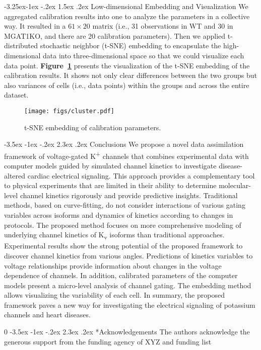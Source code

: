 \documentclass[11pt]{article}
\makeatletter
\newcommand{\blind}{0}
\renewcommand\section{\@startsection {section}{1}{\z@}%
                                   {-3.5ex \@plus -1ex \@minus -.2ex}%
                                   {2.3ex \@plus.2ex}%
                                   {\normalfont\fontfamily{phv}\fontsize{16}{19}\bfseries}}
\renewcommand\subsection{\@startsection{subsection}{2}{\z@}%
                                     {-3.25ex\@plus -1ex \@minus -.2ex}%
                                     {1.5ex \@plus .2ex}%
                                     {\normalfont\fontfamily{phv}\fontsize{14}{17}\bfseries}}
\makeatother
\begin{document}
\subsection{Low-dimensional Embedding and Visualization}
We aggregated calibration results into one to analyze the parameters in a collective way. It resulted in a $61\times20$ matrix (i.e., 31 observations in WT and 30 in MGAT1KO, and there are 20 calibration parameters). Then we applied t-distributed stochastic neighbor (t-SNE) embedding to encapsulate the high-dimensional data into three-dimensional space so that we could visualize each data point. \textbf{Figure~\ref{fig:cluster}} presents the visualization of the t-SNE embedding of the calibration results. It shows not only clear differences between the two groups but also variances of cells (i.e., data points) within the groups and across the entire dataset.
\begin{figure}[!ht]
    \centering
    \texttt{[image: figs/cluster.pdf]}
    \caption{t-SNE embedding of calibration parameters.}
    \label{fig:cluster}
\end{figure}

\section{Conclusions}\label{s:conclusions}
We propose a novel data assimilation framework of voltage-gated K\textsuperscript{+} channels that combines experimental data with computer models guided by simulated channel kinetics to investigate disease-altered cardiac electrical signaling. This approach provides a complementary tool to physical experiments that are limited in their ability to determine molecular-level channel kinetics rigorously and provide predictive insights. Traditional methods, based on curve-fitting, do not consider interactions of various gating variables across isoforms and dynamics of kinetics according to changes in protocols. The proposed method focuses on more comprehensive modeling of underlying channel kinetics of K\textsubscript{v} isoforms than traditional approaches. Experimental results show the strong potential of the proposed framework to discover channel kinetics from various angles. Predictions of kinetics variables to voltage relationships provide information about changes in the voltage dependence of channels. In addition, calibrated parameters of the computer models present a micro-level analysis of channel gating. The embedding method allows visualizing the variability of each cell. In summary, the proposed framework paves a new way for investigating the electrical signaling of potassium channels and heart diseases. 

\blind{
\section*{Acknowledgements}
The authors acknowledge the generous support from the funding agency of XYZ and funding list} \fi



	
\end{document}
